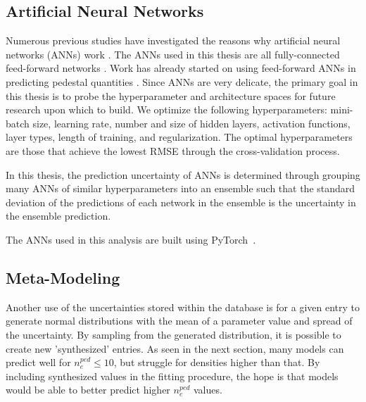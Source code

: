 \documentclass[a4paper, twoside, final, 12pt]{article}
\begin{document}
\subsection{Artificial Neural Networks}

Numerous previous studies have investigated the reasons why artificial neural networks (ANNs) work \cite{silver_mastering_2016, 7333916, CALTECH}.  The ANNs used in this thesis are all fully-connected feed-forward networks \cite{Goodfellow-et-al-2016, SCHMIDHUBER201585}. Work has already started on using feed-forward ANNs in predicting pedestal quantities \cite{Andreas}. 
Since ANNs are very delicate, the primary goal in this thesis is to probe the hyperparameter and architecture spaces for future research upon which to build. We optimize the following hyperparameters: mini-batch size, learning rate, number and size of hidden layers, activation functions, layer types, length of training, and regularization. The optimal hyperparameters are those that achieve the lowest RMSE through the cross-validation process.

In this thesis, the prediction uncertainty of ANNs is determined through grouping many ANNs of similar hyperparameters into an ensemble such that the standard deviation of the predictions of each network in the ensemble is the uncertainty in the ensemble prediction.

The ANNs used in this analysis are built using PyTorch~\cite{NEURIPS2019_9015}. 


\subsection{Meta-Modeling}
Another use of the uncertainties stored within the database is for a given entry to generate normal distributions with the mean of a parameter value and spread of the uncertainty. By sampling from the generated distribution, it is possible to create new 'synthesized' entries.
As seen in the next section, many models can predict well for $n_e^{ped} \leq 10$, but struggle for densities higher than that.
By including synthesized values in the fitting procedure, the hope is that models would be able to better predict higher $n_e^{ped}$ values.
\vspace{3cm}
\end{document}

